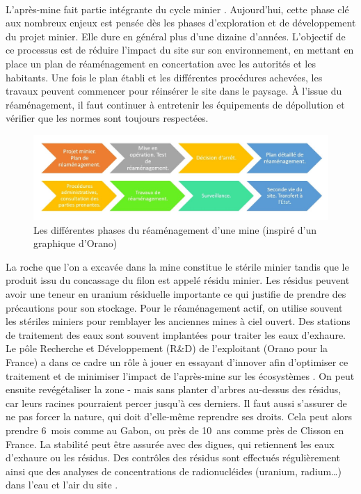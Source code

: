 \documentclass{article}
\begin{document}
\paragraph{} L’après-mine fait partie intégrante du cycle minier \cite{himeur_apres-mine_2020}. Aujourd’hui, cette phase clé aux nombreux enjeux est pensée dès les phases d’exploration et de développement du projet minier. Elle dure en général plus d'une dizaine d’années. L’objectif de ce processus est de réduire l’impact du site sur son environnement, en mettant en place un plan de réaménagement en concertation avec les autorités et les habitants. Une fois le plan établi et les différentes procédures achevées, les travaux peuvent commencer pour réinsérer le site dans le paysage. À l’issue du réaménagement, il faut continuer à entretenir les équipements de dépollution et vérifier que les normes sont toujours respectées.


\begin{figure}[H]
    \centering
    \includegraphics[width= \textwidth]{I_B_3.jpg}
    \caption{Les différentes phases du réaménagement d'une mine (inspiré d'un graphique d'Orano)}
    \label{fig:phases_reamenagement}
\end{figure}

La roche que l’on a excavée dans la mine constitue le stérile minier tandis que le produit issu du concassage du filon est appelé résidu minier. Les résidus peuvent avoir une teneur en uranium résiduelle importante ce qui justifie de prendre des précautions pour son stockage.
Pour le réaménagement actif, on utilise souvent les stériles miniers pour remblayer les anciennes mines à ciel ouvert.
Des stations de traitement des eaux sont souvent implantées pour traiter les eaux d’exhaure. Le pôle Recherche et Développement (R\&D) de l’exploitant (Orano pour la France) a dans ce cadre un rôle à jouer en essayant d’innover afin d’optimiser ce traitement et de minimiser l’impact de l’après-mine sur les écosystèmes \cite{schick_les_2020}.
On peut ensuite revégétaliser la zone - mais sans planter d’arbres au-dessus des résidus, car leurs racines pourraient percer jusqu’à ces derniers. Il faut aussi s’assurer de ne pas forcer la nature, qui doit d’elle-même reprendre ses droits. Cela peut alors prendre 6~mois comme au Gabon, ou près de 10~ans comme près de Clisson en France. La stabilité peut être assurée avec des digues, qui retiennent les eaux d’exhaure ou les résidus. Des contrôles des résidus sont effectués régulièrement ainsi que des analyses de concentrations de radionucléides (uranium, radium…) dans l’eau et l’air du site \cite{himeur_apres-mine_2020}.
\end{document}
